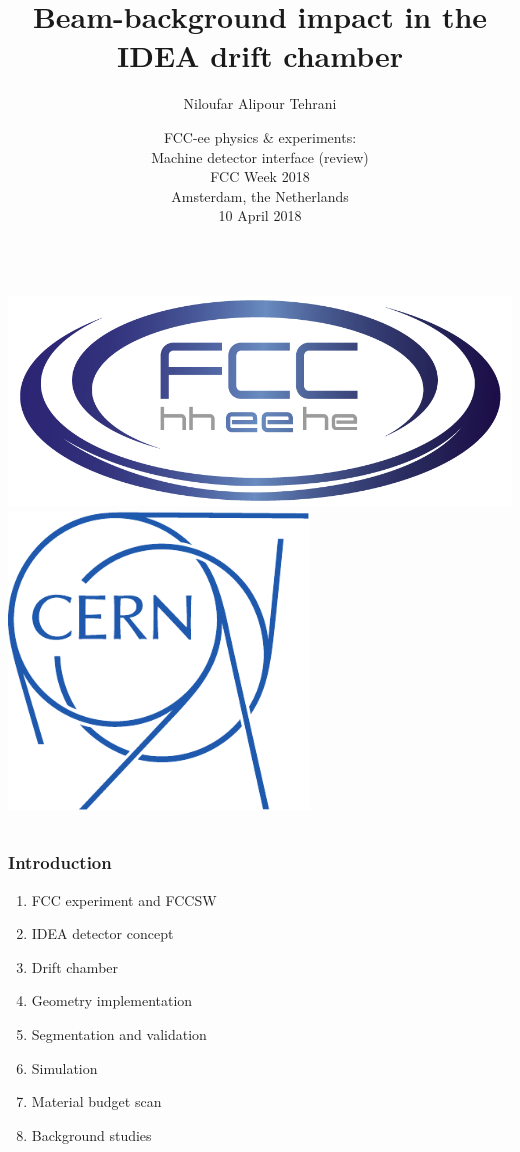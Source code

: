 \documentclass[hyperref={colorlinks=true,pdfpagelabels=false,linkcolor=black}, xcolor=dvipsnames,10pt]{beamer}
\title[]{Beam-background impact in the IDEA drift chamber}
\author[Niloufar Alipour Tehrani]{Niloufar Alipour Tehrani
  \vspace{0.3cm} }
\institute[CERN]{}
\date[10 April 2018]{FCC-ee physics \& experiments: \vspace{0.3cm}
	\\ Machine detector interface (review)\\ \vspace{0.5cm}
  \scriptsize{FCC Week 2018 \\ Amsterdam, the Netherlands \\ \vspace{0.3cm}
10 April 2018}}
\renewcommand{\inserttotalframenumber}{\ref{lastframe}}
\begin{document}
\renewcommand{\inserttotalframenumber}{\pageref{lastslide}}



\begin{frame}[plain]
  
  \titlepage
  \begin{columns}
    \centering
    \includegraphics[width=\textwidth]{../logos/FCC-logo}
    \centering
    \includegraphics[width=0.6\textwidth]{../logos/logo_cern.pdf}
  \end{columns}
\end{frame}


\begin{frame}
	\frametitle{Introduction}
	
	\begin{enumerate}
	\item FCC experiment and FCCSW
	\item IDEA detector concept
	\item Drift chamber
	\item Geometry implementation
	\item Segmentation and validation
	\item Simulation
	\item Material budget scan
	\item Background studies
	\end{enumerate}
	



\end{frame}
\end{document}
